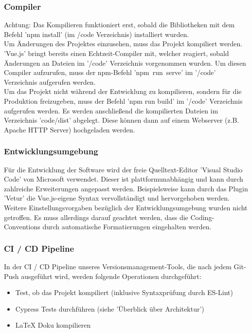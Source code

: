 \documentclass[twoside]{report}
\begin{document}
\subsubsection{Compiler}
Achtung: Das Kompilieren funktioniert erst, sobald die Bibliotheken mit dem Befehl
'npm install' (im /code Verzeichnis) installiert wurden.
\\
Um Änderungen des Projektes einzusehen, muss das Projekt kompiliert werden.
'Vue.js' bringt bereits einen Echtzeit-Compiler mit, welcher reagiert, sobald Änderungen
an Dateien im '/code' Verzeichnis vorgenommen wurden. Um diesen Compiler aufzurufen, muss der npm-Befehl \mbox{'npm run serve'} im '/code' Verzeichnis
aufgerufen werden.
\\Um das Projekt nicht während der Entwicklung zu kompilieren, sondern für die Produktion freizugeben,
muss der Befehl 'npm run build' im '/code' Verzeichnis aufgerufen werden. Es werden
anschließend die kompilierten Dateien im Verzeichnis 'code/dist' abgelegt.
Diese können dann auf einem Webserver (z.B. Apache HTTP Server) hochgeladen werden.

\subsubsection{Entwicklungsumgebung}
Für die Entwicklung der Software wird der freie Quelltext-Editor 'Visual Studio Code'
von Microsoft verwendet. Dieser ist plattformunabhängig und kann durch zahlreiche Erweiterungen
angepasst werden. Beispielsweise kann durch das Plugin 'Vetur' die Vue.js-eigene Syntax
vervollständigt und hervorgehoben werden.
\\Weitere Einstellungsvorgaben bezüglich der Entwicklungsumgebung wurden nicht getroffen.
Es muss allerdings darauf geachtet werden, dass die Coding-Conventions durch automatische
Formatierungen eingehalten werden.

\subsubsection{CI / CD Pipeline}
In der CI / CD Pipeline unseres Versionsmanagement-Tools, die nach jedem Git-Push
ausgeführt wird, werden folgende Operationen durchgeführt:
\begin{itemize}
  \item Test, ob das Projekt kompiliert (inklusive Syntaxprüfung durch ES-Lint)
  \item Cypress Tests durchführen (siehe 'Überblick über Architektur')
  \item LaTeX Doku kompilieren
\end{itemize}
\end{document}
